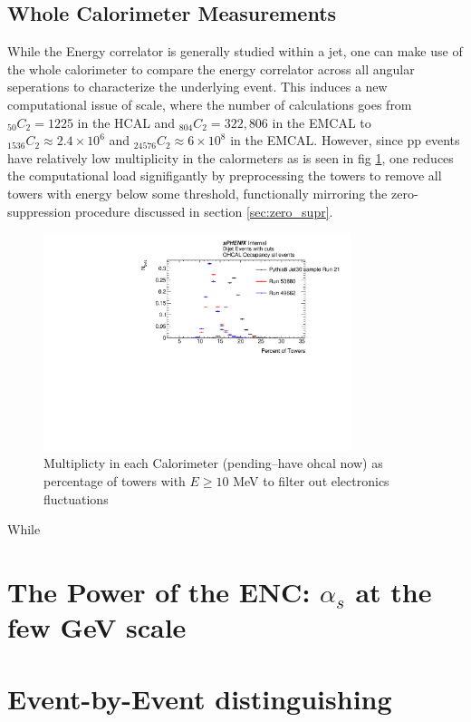\documentclass[letterpaper, 12pt, oneside]{book}
\theoremstyle{definition}
\begin{document}
	\section{Whole Calorimeter Measurements}
	While the Energy correlator is generally studied within a jet, one can make use of the whole calorimeter to compare the energy correlator across all angular seperations to characterize the underlying event. 
	This induces a new computational issue of scale, where the number of calculations goes from $_{50}C_2=1225$ in the HCAL and $_{804} C_2=322,806$ in the EMCAL to $_{1536}C_2 \approx 2.4 \times 10^6$ and $_{24576}C_2 \approx 6 \times 10^8$ in the EMCAL. 
	However, since pp events have relatively low multiplicity in the calormeters as is seen in fig \ref{fig:calo_pp_multiplicity}, one reduces the computational load signifigantly by preprocessing the towers to remove all towers with energy below some threshold, functionally mirroring the zero-suppression procedure discussed in section \ref{sec:zero_supr}.
	\begin{figure}
		\includegraphics[width=0.8\textwidth]{ohcal_occup}%
		\caption{Multiplicty in each Calorimeter (pending--have ohcal now) as percentage of towers with $E \geq 10$ MeV to filter out electronics fluctuations}
		\label{fig:calo_pp_multiplicity}
	\end{figure}
	While 
\chapter{The Power of the ENC: $\alpha_s$ at the few GeV scale}
\label{ch:alphas}
\chapter{Event-by-Event distinguishing} 
\label{ch:qgdiscr}
\end{document}
